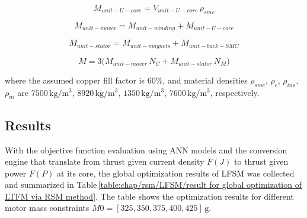                    
                    \begin{equation}
                        M_{unit-U-core} =  V_{unit-U-core}\,\rho_{smc}
                        \label{eq:chap/rsm/LTFM/mass/M unit U-core smc}
                    \end{equation}
                    
                    
                    \begin{equation}
                        M_{unit-mover} =  M_{unit-winding}+M_{unit-U-core}
                        \label{eq:chap/rsm/LTFM/mass/M unit mover}
                    \end{equation}
                    
                    
                    \begin{equation}
                        M_{unit-stator} =  M_{unit-magnets}+M_{unit-back-SMC}
                        \label{eq:chap/rsm/LTFM/mass/M unit stator}
                    \end{equation}
                    
                    
                    \begin{equation}
                        M =  3 \big( M_{unit-mover}\,N_C + M_{unit-stator}\,N_M \big)
                        \label{eq:chap/rsm/LTFM/mass/total mass}
                    \end{equation}
                    
                    
                where the assumed copper fill factor is $60\%$, and material densities $\rho_{smc}$, $\rho_c$, $\rho_{ins}$, $\rho_{m}$ are $7500\,\mathrm{kg/m^3}$, $8920\,\mathrm{kg/m^3}$, $1350\,\mathrm{kg/m^3}$, $7600\,\mathrm{kg/m^3}$, respectively.

        \subsection{Results}                   \label{Chapter:RSM/LTFM/Results}
        
            
            With the objective function evaluation using \acs{ANN} models and the conversion engine that translate from thrust given current density $F(J)$ to thrust given power $F(P)$ at its core, the global optimization results of \acs{LFSM} was collected and summarized in Table\,\ref{table:chap/rsm/LFSM/result for global optimization of LTFM via RSM method}. The table shows the optimization results for different motor mass constraints $M0 = [325, 350, 375, 400, 425]\,\mathrm{g}$.
            
